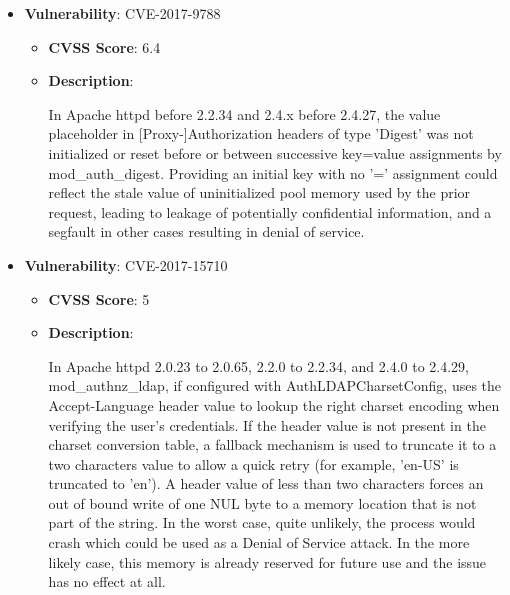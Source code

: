 \documentclass{article}
\begin{document}
\begin{itemize}
        \item \textbf{Vulnerability}: CVE-2017-9788
        \begin{itemize}
            \item \textbf{CVSS Score}:  6.4 
            \item \textbf{Description}:
            \parbox[t]{0.9\linewidth}{
                \ttfamily In Apache httpd before 2.2.34 and 2.4.x before 2.4.27, the value placeholder in [Proxy-]Authorization headers of type 'Digest' was not initialized or reset before or between successive key=value assignments by mod\_auth\_digest. Providing an initial key with no '=' assignment could reflect the stale value of uninitialized pool memory used by the prior request, leading to leakage of potentially confidential information, and a segfault in other cases resulting in denial of service.
            }
        \end{itemize}
    
        \item \textbf{Vulnerability}: CVE-2017-15710
        \begin{itemize}
            \item \textbf{CVSS Score}:  5 
            \item \textbf{Description}:
            \parbox[t]{0.9\linewidth}{
                \ttfamily In Apache httpd 2.0.23 to 2.0.65, 2.2.0 to 2.2.34, and 2.4.0 to 2.4.29, mod\_authnz\_ldap, if configured with AuthLDAPCharsetConfig, uses the Accept-Language header value to lookup the right charset encoding when verifying the user's credentials. If the header value is not present in the charset conversion table, a fallback mechanism is used to truncate it to a two characters value to allow a quick retry (for example, 'en-US' is truncated to 'en'). A header value of less than two characters forces an out of bound write of one NUL byte to a memory location that is not part of the string. In the worst case, quite unlikely, the process would crash which could be used as a Denial of Service attack. In the more likely case, this memory is already reserved for future use and the issue has no effect at all.
            }
        \end{itemize}
    

\end{itemize}
\end{document}
